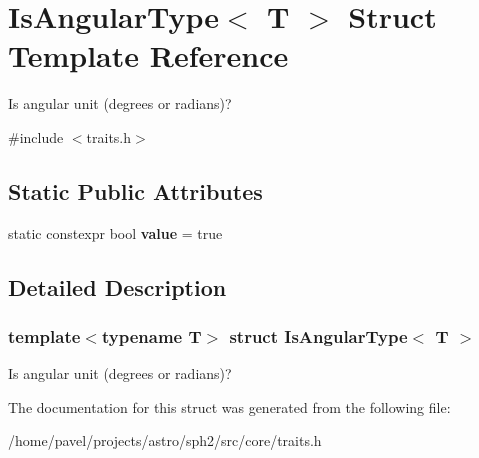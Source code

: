 \hypertarget{structIsAngularType}{}\section{Is\+Angular\+Type$<$ T $>$ Struct Template Reference}
\label{structIsAngularType}


Is angular unit (degrees or radians)?  




{\ttfamily \#include $<$traits.\+h$>$}

\subsection*{Static Public Attributes}
\begin{DoxyCompactItemize}
\item 
\hypertarget{structIsAngularType_ace623476ee3483065c0b71a4853cca2e}{}\label{structIsAngularType_ace623476ee3483065c0b71a4853cca2e} 
static constexpr bool {\bfseries value} = true
\end{DoxyCompactItemize}


\subsection{Detailed Description}
\subsubsection*{template$<$typename T$>$\newline
struct Is\+Angular\+Type$<$ T $>$}

Is angular unit (degrees or radians)? 

The documentation for this struct was generated from the following file\+:\begin{DoxyCompactItemize}
\item 
/home/pavel/projects/astro/sph2/src/core/traits.\+h\end{DoxyCompactItemize}
